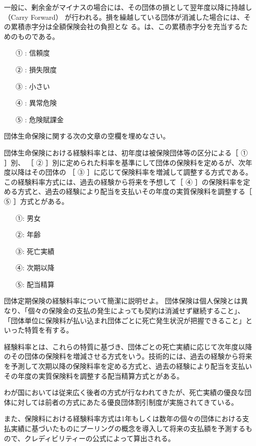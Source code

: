 \documentclass[report,gutter=10mm,fore-edge=10mm,uplatex,dvipdfmx]{jlreq}
\begin{document}
一般に、剰余金がマイナスの場合には、その団体の損として翌年度以降に持越し（Carry Forward）
が行われる。損を繰越している団体が消滅した場合には、その累積赤字分は全額保険会社の負担とな
る。は、この累積赤字分を充当するためのものである。

\answer{}

\begin{itemize}
\item[ ① : ] 信頼度 
\item[ ② : ] 損失限度 
\item[ ③ : ] 小さい 
\item[ ④ : ] 異常危険 
\item[ ⑤ : ] 危険賦課金
\end{itemize}

団体生命保険に関する次の文章の空欄を埋めなさい。

団体生命保険における経験料率とは、初年度は被保険団体等の区分による［ ① ］別、
［ ② ］別に定められた料率を基準にして団体の保険料を定めるが、次年度以降はその団体の
［ ③ ］に応じて保険料率を増減して調整する方式である。この経験料率方式には、過去の経験から将来を予想して［ ④ ］の保険料率を定める方式と、過去の経験により配当を支払いその年度の実質保険料を調整する［ ⑤ ］方式とがある。
\answer{}
\begin{itemize}
\item[ ①: ] 男女
\item[ ②: ] 年齢
\item[ ③: ] 死亡実績
\item[ ④: ] 次期以降
\item[ ⑤: ] 配当精算
\end{itemize}

団体定期保険の経験料率について簡潔に説明せよ。
\answer{}
団体保険は個人保険とは異なり、「個々の保険金の支払の発生によっても契約は消滅せず継続すること」、「団体単位に保険料が払い込まれ団体ごとに死亡発生状況が把握できること」といった特質を有する。

経験料率とは、これらの特質に基づき、団体ごとの死亡実績に応じて次年度以降のその団体の保険料を増減させる方式をいう。技術的には、過去の経験から将来を予測して次期以降の保険料率を定める方式と、過去の経験により配当を支払いその年度の実質保険料を調整する配当精算方式とがある。

わが国においては従来広く後者の方式が行なわれてきたが、死亡実績の優良な団体に対しては前者の方式にあたる優良団体割引制度が実施されてきている。

また、保険料における経験料率方式は1年もしくは数年の個々の団体における支払実績に基づいたものにプーリングの概念を導入して将来の支払額を予測するもので、クレディビリティーの公式によって算出される。
\end{document}
